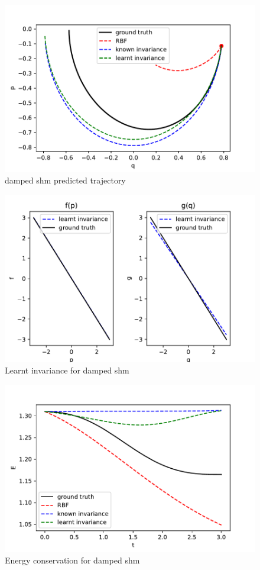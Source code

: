 \documentclass{statsmsc}
\begin{document}
\begin{figure}[H]
        \centering
        \includegraphics[width=\linewidth]{../codes/figures/damped_shm_predicted.pdf}
        \caption{damped shm predicted trajectory}
        \label{fig:damped_shm_prediction}
\end{figure}


\begin{figure}[H] 
  \includegraphics[width=0.6\linewidth]{../codes/figures/damped_shm_learnt.pdf}
  \centering
  \caption{Learnt invariance for damped shm}
  \label{fig:damped_shm_learnt}
\end{figure}

\begin{figure}[H] 
  \includegraphics[width=0.6\linewidth]{../codes/figures/damped_shm_energy.pdf}
  \centering
  \caption{Energy conservation for damped shm}
  \label{fig:damped_shm_energy}
\end{figure}
\end{document}
